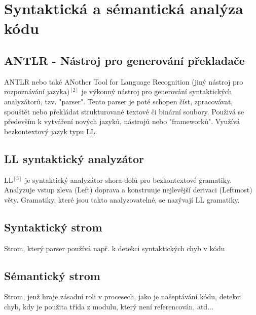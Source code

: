 \documentclass[czech,master,dept460,male,cpp,cpdeclaration]{diploma}
\begin{document}
\section{Syntaktická a sémantická analýza kódu}
\subsection{ANTLR - Nástroj pro generování překladače}
ANTLR nebo také ANother Tool for Language Recognition (jiný nástroj pro rozpoznávání jazyka)$^{[2]}$ je výkonný nástroj pro generování syntaktických analyzátorů, tzv. "parser". Tento parser je poté schopen číst, zpracovávat, spouštět nebo překládat strukturované textové či binární soubory. Použivá se především k vytváření nových jazyků, nástrojů nebo "frameworků". Využívá bezkontextový jazyk typu LL.
\subsection{LL syntaktický analyzátor}
LL$^{[3]}$ je syntaktický analyzátor shora-dolů pro bezkontextové gramatiky. Analyzuje vstup zleva (Left) doprava a konstruuje nejlevější derivaci (Leftmost) věty. Gramatiky, které jsou takto analyzovatelné, se nazývají LL gramatiky.

\subsection{Syntaktický strom}
Strom, který parser používá např. k detekci syntaktických chyb v kódu
\subsection{Sémantický strom}
Strom, jenž hraje zásadní roli v procesech, jako je našeptávání kódu, detekci chyb, kdy je použita třída z modulu, který není referencován, atd...
\end{document}
